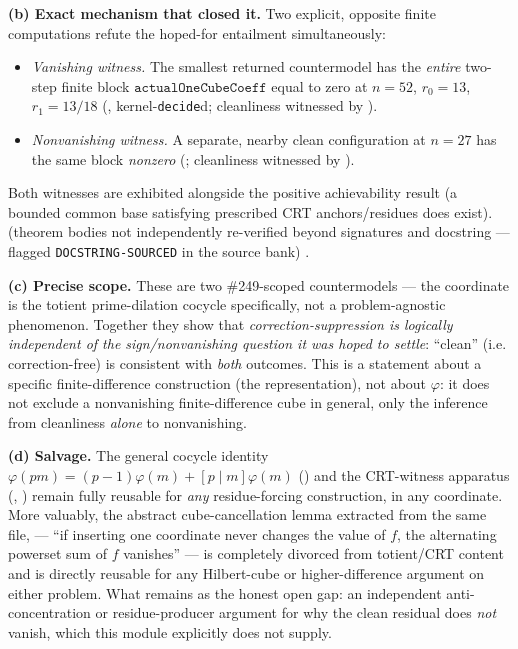 \textbf{(b) Exact mechanism that closed it.} Two explicit, opposite
finite computations refute the hoped-for entailment simultaneously:
\begin{itemize}[nosep]
\item \emph{Vanishing witness.} The smallest returned countermodel has the
\emph{entire} two-step finite block \(\mathtt{actualOneCubeCoeff}\) equal to
zero at \(n=52\), \(r_0=13\), \(r_1=13/18\)
(, kernel-\texttt{decide}d;
cleanliness witnessed by ).
\item \emph{Nonvanishing witness.} A separate, nearby clean configuration at
\(n=27\) has the same block \emph{nonzero}
(; cleanliness witnessed by
).
\end{itemize}
Both witnesses are exhibited alongside the positive achievability result
 (a bounded common base satisfying prescribed
CRT anchors/residues does exist).  (theorem bodies not
independently re-verified beyond signatures and docstring — flagged
\texttt{DOCSTRING-SOURCED} in the source bank) 
.

\textbf{(c) Precise scope.} These are two \#249-scoped countermodels — the
coordinate is the totient prime-dilation cocycle specifically, not a
problem-agnostic phenomenon. Together they show that
\emph{correction-suppression is logically independent of the
sign/nonvanishing question it was hoped to settle}: ``clean'' (i.e.
correction-free) is consistent with \emph{both} outcomes. This is a
statement about a specific finite-difference construction (the
representation), not about \(\varphi\): it does not exclude a nonvanishing
finite-difference cube in general, only the inference from cleanliness
\emph{alone} to nonvanishing.

\textbf{(d) Salvage.} The general cocycle identity
\(\varphi(pm)=(p-1)\varphi(m)+[p\mid m]\varphi(m)\)
() and the CRT-witness apparatus
(, ) remain fully reusable for
\emph{any} residue-forcing construction, in any coordinate. More valuably,
the abstract cube-cancellation lemma extracted from the same file,
 — ``if inserting one
coordinate never changes the value of \(f\), the alternating powerset sum of
\(f\) vanishes'' — is completely divorced from totient/CRT content and is
directly reusable for any Hilbert-cube or higher-difference argument on
either problem. What remains as the honest open gap: an independent
anti-concentration or residue-producer argument for why the clean residual
does \emph{not} vanish, which this module explicitly does not supply.

